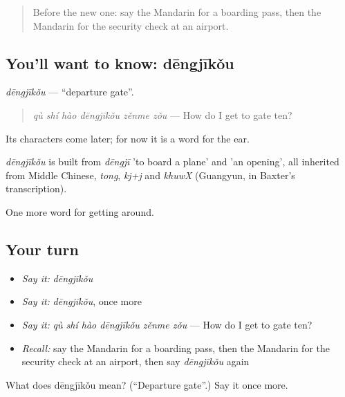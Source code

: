 \begin{quote}
Before the new one: say the Mandarin for a boarding pass, then the Mandarin for the security check at an airport.
\end{quote}

\subsection*{You'll want to know: dēngjīkǒu}
\emph{dēngjīkǒu} — \textquotedblleft{}departure gate\textquotedblright{}.

\begin{quote}
\emph{qù shí hào dēngjīkǒu zěnme zǒu} — How do I get to gate ten?
\end{quote}

Its characters come later; for now it is a word for the ear.

\begin{cousinweb}
\emph{dēngjīkǒu} is built from \emph{dēngjī} 'to board a plane' and  'an opening', all inherited from Middle Chinese, \emph{tong}, \emph{kj+j} and \emph{khuwX} (Guangyun, in Baxter's transcription).
\end{cousinweb}

\begin{grammarlens}[title={What you've built}]
One more word for getting around.
\end{grammarlens}

\subsection*{Your turn}
\begin{itemize}
\raggedright
  \item \emph{Say it:} \emph{dēngjīkǒu}
  \item \emph{Say it:} \emph{dēngjīkǒu}, once more
  \item \emph{Say it:} \emph{qù shí hào dēngjīkǒu zěnme zǒu} — How do I get to gate ten?
  \item \emph{Recall:} say the Mandarin for a boarding pass, then the Mandarin for the security check at an airport, then say \emph{dēngjīkǒu} again
\end{itemize}

\begin{tcolorbox}[breakable,colback=teal!4,colframe=teal!35!black,title={Before you move on}]
What does dēngjīkǒu mean? (\textquotedblleft{}Departure gate\textquotedblright{}.) Say it once more.
\end{tcolorbox}
